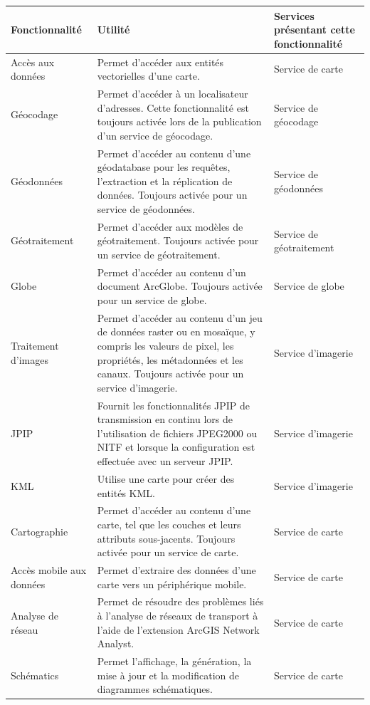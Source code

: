 \documentclass[11pt]{article}
\begin{document}
\begin{table}[H]
	\begin{center}
		\footnotesize
		\begin{tabular}{|m{3 cm}|p{7 cm}|p{3 cm}|}
			\hline 
			\textbf{Fonctionnalité} & \textbf{Utilité} & \textbf{Services présentant cette fonctionnalité} \\
			\hline
			Accès aux données & Permet d'accéder aux entités vectorielles d'une carte. & Service de carte \\
			Géocodage & Permet d'accéder à un localisateur d'adresses. Cette fonctionnalité est toujours activée lors de la publication d'un service de géocodage. & Service de géocodage \\
			Géodonnées & Permet d'accéder au contenu d'une géodatabase pour les requêtes, l'extraction et la réplication de données. Toujours activée pour un service de géodonnées. & Service de géodonnées \\
			Géotraitement & Permet d'accéder aux modèles de géotraitement. Toujours activée pour un service de géotraitement. & Service de géotraitement \\
			Globe & Permet d'accéder au contenu d'un document ArcGlobe. Toujours activée pour un service de globe. & Service de globe \\
			Traitement d'images & Permet d'accéder au contenu d'un jeu de données raster ou en mosaïque, y compris les valeurs de pixel, les propriétés, les métadonnées et les canaux. Toujours activée pour un service d'imagerie. & Service d'imagerie\\
			JPIP & Fournit les fonctionnalités JPIP de transmission en continu lors de l'utilisation de fichiers JPEG2000 ou NITF et lorsque la configuration est effectuée avec un serveur JPIP. & Service d'imagerie \\
			KML & Utilise une carte pour créer des entités KML. & Service d'imagerie \\
			Cartographie & Permet d'accéder au contenu d'une carte, tel que les couches et leurs attributs sous-jacents. Toujours activée pour un service de carte. & Service de carte \\
			Accès mobile aux données & Permet d'extraire des données d'une carte vers un périphérique mobile. & Service de carte \\
			Analyse de réseau & Permet de résoudre des problèmes liés à l'analyse de réseaux de transport à l'aide de l'extension ArcGIS Network Analyst. & Service de carte \\
			Schématics & Permet l'affichage, la génération, la mise à jour et la modification de diagrammes schématiques. & Service de carte \\

\end{tabular}
\end{center}
\end{table}
\end{document}
